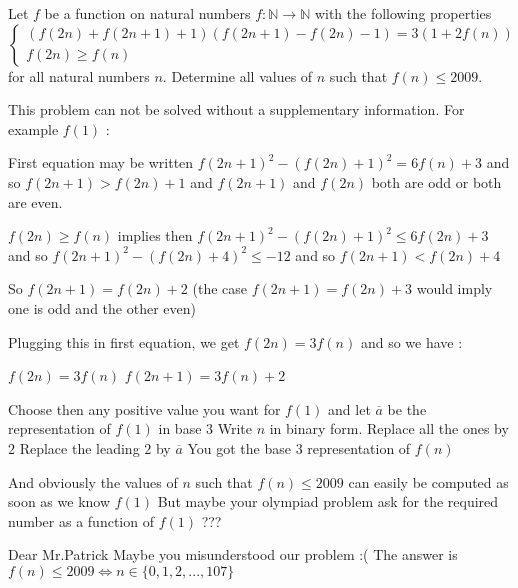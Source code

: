 \begin{solution}
	\begin{tcolorbox}Let $f$ be a function on natural numbers $f:\mathbb{N}\to\mathbb{N}$ with the following properties 
\[\begin{cases}\left ( f(2n)+f(2n+1)+1 \right )\left ( f(2n+1)-f(2n)-1 \right )=3\left ( 1+2f(n) \right )\\f(2n)\geq f(n)\end{cases}\] for all natural numbers $n$. Determine all values of $n$ such that $f(n)\leq 2009$.\end{tcolorbox}
This problem can not be solved without a supplementary information. For example $f(1)$ :

First equation may be written $f(2n+1)^2-(f(2n)+1)^2=6f(n)+3$ and so $f(2n+1)>f(2n)+1$ and $f(2n+1)$ and $f(2n)$ both are odd or both are even.

$f(2n)\ge f(n)$ implies then $f(2n+1)^2-(f(2n)+1)^2\le 6f(2n)+3$
and so $f(2n+1)^2-(f(2n)+4)^2\le -12$ and so $f(2n+1)< f(2n)+4$

So $f(2n+1)=f(2n)+2$ (the case $f(2n+1)=f(2n)+3$ would imply one is odd and the other even)

Plugging this in first equation, we get $f(2n)=3f(n)$ and so we have :

$f(2n)=3f(n)$
$f(2n+1)=3f(n)+2$

Choose then any positive value you want for $f(1)$ and let $\overline a$ be the representation of $f(1)$ in base $3$
Write $n$ in binary form.
Replace all the ones by $2$
Replace the leading $2$ by $\overline a$
You got the base $3$ representation of $f(n)$

And obviously the values of $n$ such that $f(n)\le 2009$ can easily be computed as soon as we know $f(1)$
But maybe your olympiad problem ask for the required number as a function of $f(1)$  ???
\end{solution}



\begin{solution}
	Dear Mr.Patrick 
Maybe you misunderstood our problem :( 
The answer is $\boxed{ f(n)\le 2009 \iff n\in \{0,1,2,...,107\}}$
\end{solution}



